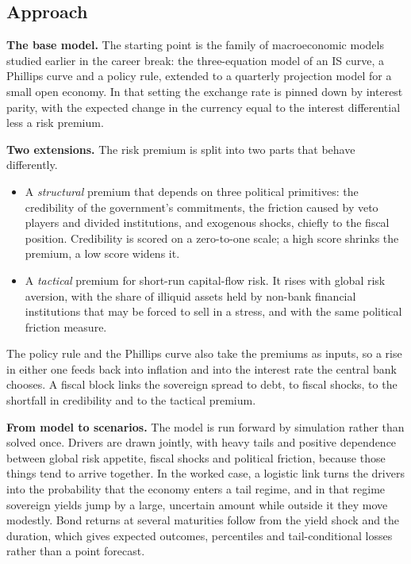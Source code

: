 \documentclass[
  british,
  a4paper,
]{article}
\providecommand{\tightlist}{%
  \setlength{\itemsep}{0pt}\setlength{\parskip}{0pt}}
\begin{document}
\subsection{Approach}\label{approach}

\textbf{The base model.} The starting point is the family of
macroeconomic models studied earlier in the career break: the
three-equation model of an IS curve, a Phillips curve and a policy rule,
extended to a quarterly projection model for a small open economy. In
that setting the exchange rate is pinned down by interest parity, with
the expected change in the currency equal to the interest differential
less a risk premium.

\textbf{Two extensions.} The risk premium is split into two parts that
behave differently.

\begin{itemize}
\tightlist
\item
  A \emph{structural} premium that depends on three political
  primitives: the credibility of the government's commitments, the
  friction caused by veto players and divided institutions, and
  exogenous shocks, chiefly to the fiscal position. Credibility is
  scored on a zero-to-one scale; a high score shrinks the premium, a low
  score widens it.
\item
  A \emph{tactical} premium for short-run capital-flow risk. It rises
  with global risk aversion, with the share of illiquid assets held by
  non-bank financial institutions that may be forced to sell in a
  stress, and with the same political friction measure.
\end{itemize}

The policy rule and the Phillips curve also take the premiums as inputs,
so a rise in either one feeds back into inflation and into the interest
rate the central bank chooses. A fiscal block links the sovereign spread
to debt, to fiscal shocks, to the shortfall in credibility and to the
tactical premium.

\textbf{From model to scenarios.} The model is run forward by simulation
rather than solved once. Drivers are drawn jointly, with heavy tails and
positive dependence between global risk appetite, fiscal shocks and
political friction, because those things tend to arrive together. In the
worked case, a logistic link turns the drivers into the probability that
the economy enters a tail regime, and in that regime sovereign yields
jump by a large, uncertain amount while outside it they move modestly.
Bond returns at several maturities follow from the yield shock and the
duration, which gives expected outcomes, percentiles and
tail-conditional losses rather than a point forecast.
\end{document}
